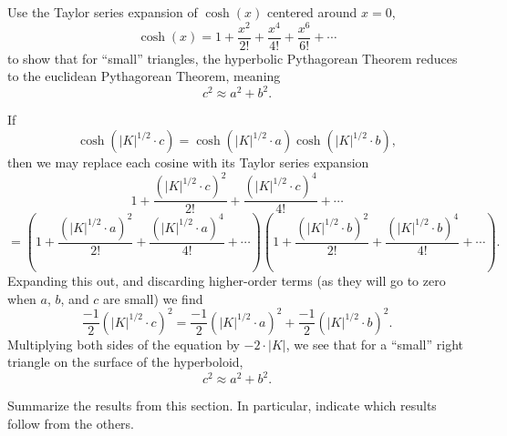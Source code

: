 \documentclass[newpage,hints,,12pt,noauthor,nooutcomes,handout]{ximera}
\begin{document}
\begin{problem}
  Use the Taylor series expansion of $\cosh(x)$ centered around $x=0$,
  \[
  \cosh(x) = 1 + \frac{x^2}{2!} + \frac{x^4}{4!} + \frac{x^6}{6!} + \cdots
  \]
to show that for ``small'' triangles, the hyperbolic Pythagorean
Theorem reduces to the euclidean Pythagorean Theorem, meaning
\[
c^2 \approx a^2+b^2.
\]
\begin{freeResponse}
  If
  \[
  \cosh\left(|K|^{1/2}\cdot c\right)=\cosh\left(|K|^{1/2}\cdot a\right)\cosh\left(|K|^{1/2}\cdot b\right),
  \]
  then we may replace each cosine with its Taylor series expansion
  \[
  1 + \frac{\left(|K|^{1/2}\cdot c\right)^2}{2!} + \frac{\left(|K|^{1/2}\cdot c\right)^4}{4!} +  \cdots
  \]
  \[
  =\left(
  1 + \frac{\left(|K|^{1/2}\cdot a\right)^2}{2!} + \frac{\left(|K|^{1/2}\cdot a\right)^4}{4!} +  \cdots
  \right)
  \left(
  1 + \frac{\left(|K|^{1/2}\cdot b\right)^2}{2!} + \frac{\left(|K|^{1/2}\cdot b\right)^4}{4!} + \cdots
  \right).
  \]
  Expanding this out, and discarding higher-order terms (as they will
  go to zero when $a$, $b$, and $c$ are small) we find
  \[
  \frac{-1}{2}\left(|K|^{1/2}\cdot c\right)^2 = \frac{-1}{2}\left(|K|^{1/2}\cdot a\right)^2+\frac{-1}{2}\left(|K|^{1/2}\cdot b\right)^2.
  \]
  Multiplying both sides of the equation by $-2\cdot |K|$, we see that for a
  ``small'' right triangle on the surface of the hyperboloid,
  \[
  c^2 \approx a^2 +b^2.
  \]
\end{freeResponse}
\end{problem}


\begin{problem}
Summarize the results from this section. In particular, indicate which
results follow from the others.
\begin{freeResponse}
\end{freeResponse}
\end{problem}
\end{document}
